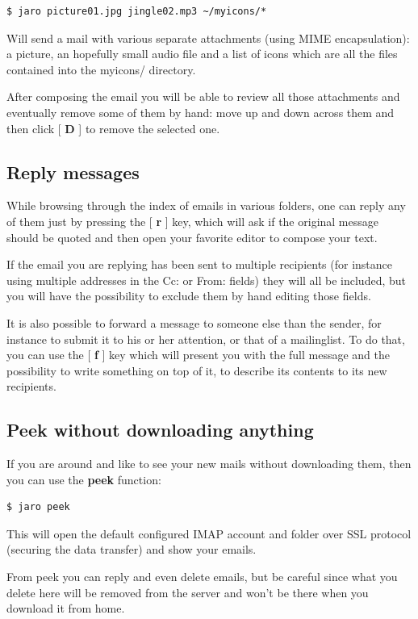 \documentclass[a4,onecolumn,portrait]{article}
\begin{document}
\begin{verbatim}
$ jaro picture01.jpg jingle02.mp3 ~/myicons/*
\end{verbatim}

Will send a mail with various separate attachments (using MIME
encapsulation): a picture, an hopefully small audio file and a list of
icons which are all the files contained into the myicons/ directory.

After composing the email you will be able to review all those
attachments and eventually remove some of them by hand: move up and
down across them and then click [ \textbf{D} ] to remove the selected one.
\subsection{Reply messages}
\label{sec-6-3}

While browsing through the index of emails in various folders, one can
reply any of them just by pressing the [ \textbf{r} ] key, which will ask if
the original message should be quoted and then open your favorite
editor to compose your text.

If the email you are replying has been sent to multiple recipients
(for instance using multiple addresses in the Cc: or From: fields)
they will all be included, but you will have the possibility to
exclude them by hand editing those fields.

It is also possible to forward a message to someone else than the
sender, for instance to submit it to his or her attention, or that of
a mailinglist. To do that, you can use the [ \textbf{f} ] key which will
present you with the full message and the possibility to write
something on top of it, to describe its contents to its new
recipients.
\subsection{Peek without downloading anything}
\label{sec-6-4}

If you are around and like to see your new mails without downloading
them, then you can use the \textbf{peek} function:

\begin{verbatim}
$ jaro peek
\end{verbatim}

This will open the default configured IMAP account and folder over SSL
protocol (securing the data transfer) and show your emails.

From peek you can reply and even delete emails, but be careful since
what you delete here will be removed from the server and won't be
there when you download it from home.
\end{document}

